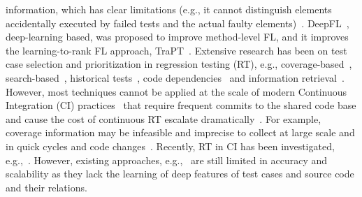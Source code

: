 information, which has clear limitations (e.g., it cannot distinguish
elements accidentally executed by failed tests and the actual faulty
elements)~\cite{li2017transforming}. DeepFL~\cite{DeepFL},
deep-learning based, was proposed to improve method-level FL, and it
improves the learning-to-rank FL approach,
TraPT~\cite{TraPT}. Extensive research has been on test case selection and prioritization in regression testing (RT), e.g., coverage-based~\cite{di2015coverage}, search-based~\cite{de2011multi,yu2010time}, historical tests~\cite{kim2002history,marijan2013test,noor2015similarity,park2008historical}, code dependencies~\cite{gligoric2015ekstazi} and information retrieval~\cite{kwon2014test,saha2015information}. 
However, most techniques cannot be applied at the scale of modern Continuous Integration (CI) practices~\cite{elbaum2014techniques} that require frequent commits to the shared code base and cause the cost of continuous RT escalate dramatically~\cite{memon2017taming}. For example, coverage information may be infeasible and imprecise to collect at large scale and in quick cycles and code changes~\cite{elbaum2014techniques,haghighatkhah2018test,hemmati2015prioritizing,yu2018study}. 
Recently, RT in CI has been investigated, e.g.,~\cite{elbaum2014techniques,gligoric2015practical,yu2018study,jiang2009adaptive,henard2016comparing}. 
However, existing approaches, e.g.,~\cite{bertolino2020learning,spieker2017reinforcement} are still limited in accuracy and scalability as they lack the learning of deep features of test cases and source code and their relations. 


